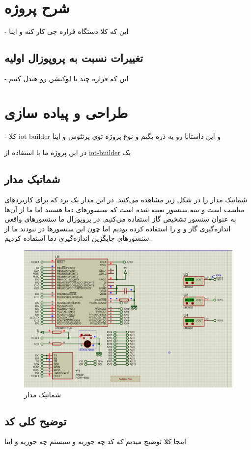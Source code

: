 \section{شرح پروژه}
- این که کلا دستگاه قراره چی کار کنه و اینا
\subsection{تغییرات نسبت به پروپوزال اولیه}
- این که قراره چند تا لوکیشن رو هندل کنیم
\section{طراحی و پیاده سازی}
- کلا iot builder و این داستانا رو یه ذره بگیم و نوع پروژه توی پرتئوس و اینا

در این پروژه ما با استفاده از 
\href{https://labcenter.s3.amazonaws.com/downloads/iotHelp.pdf}{iot-builder}
یک 
\subsection{شماتیک مدار}
شماتیک مدار را در شکل زیر مشاهده می‌کنید. در این مدار یک برد 
که برای کاربرد‌های 
مناسب است و سه سنسور
تعبیه شده است که سنسور‌های دما هستند اما ما از آن‌ها به عنوان سنسور تشخیص گاز استفاده می‌کنیم. در پروپوزال ما سنسور‌های واقعی اندازه‌گیری گاز 
و 
و
را استفاده کرده بودیم اما چون این سنسور‌ها در 
نبودند ما از سنسور‌های جایگزین اندازه‌گیری دما استفاده کردیم.
\begin{figure}[h!]
	\centering		
	\includegraphics[width=\linewidth]{figs/circuit.png}
	\caption{شماتیک مدار}
\end{figure}

\subsection{توضیح کلی کد}
اینجا کلا توضیج میدیم که کد چه جوریه و سیستم چه جوریه و اینا

